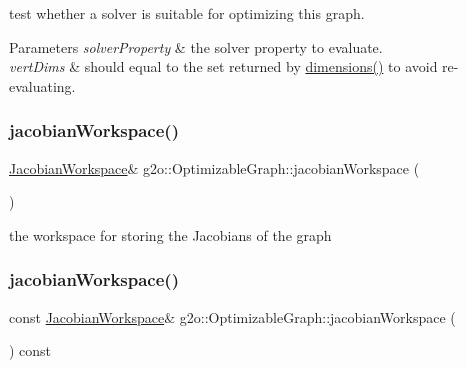 test whether a solver is suitable for optimizing this graph. 
\begin{DoxyParams}{Parameters}
{\em solver\+Property} & the solver property to evaluate. \\
\hline
{\em vert\+Dims} & should equal to the set returned by \mbox{\hyperlink{structg2o_1_1_optimizable_graph_a396e552ed234fe625e3b6785efa9c86d}{dimensions()}} to avoid re-\/evaluating. \\
\hline
\end{DoxyParams}
\mbox{\label{structg2o_1_1_optimizable_graph_aa669dbd1d6e34e49fecda711ff1b78c6}} 
\subsubsection{\texorpdfstring{jacobian\+Workspace()}{jacobianWorkspace()}\hspace{0.1cm}{\footnotesize\ttfamily [1/2]}}
{\footnotesize\ttfamily \mbox{\hyperlink{classg2o_1_1_jacobian_workspace}{Jacobian\+Workspace}}\& g2o\+::\+Optimizable\+Graph\+::jacobian\+Workspace (\begin{DoxyParamCaption}{ }\end{DoxyParamCaption})\hspace{0.3cm}{\ttfamily [inline]}}



the workspace for storing the Jacobians of the graph 

\mbox{\label{structg2o_1_1_optimizable_graph_a21d73e7a39c731d19e6bb467cad59912}} 
\subsubsection{\texorpdfstring{jacobian\+Workspace()}{jacobianWorkspace()}\hspace{0.1cm}{\footnotesize\ttfamily [2/2]}}
{\footnotesize\ttfamily const \mbox{\hyperlink{classg2o_1_1_jacobian_workspace}{Jacobian\+Workspace}}\& g2o\+::\+Optimizable\+Graph\+::jacobian\+Workspace (\begin{DoxyParamCaption}{ }\end{DoxyParamCaption}) const\hspace{0.3cm}{\ttfamily [inline]}}

